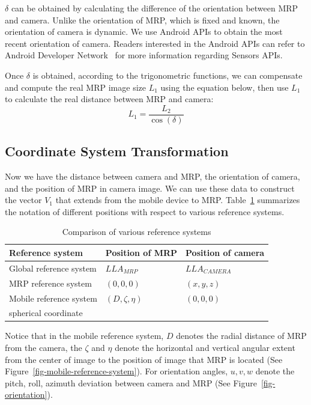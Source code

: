 $\delta$ can be obtained by calculating the difference of the orientation between MRP and camera. Unlike the orientation of MRP, which is fixed and known, the orientation of camera is dynamic. We use Android APIs to obtain the most recent orientation of camera. Readers interested in the Android APIs can refer to Android Developer Network~\cite{android-sensors-apis} for more information regarding Sensors APIs.

Once $\delta$ is obtained, according to the trigonometric functions, we can compensate and compute the real MRP image size \emph{$L_1$} using the equation below, then use \emph{$L_1$} to calculate the real distance between MRP and camera:
\[L_1 = \frac{{L_2}}{{\cos (\delta )}}\]

\subsection{Coordinate System Transformation}
Now we have the distance between camera and MRP, the orientation of camera, and the position of MRP in camera image. We can use these data to construct the vector \emph{$V_1$} that extends from the mobile device to MRP. Table~\ref{tb-comare-reference-system} summarizes the notation of different positions with respect to various reference systems.
\begin{table}
\begin{center}
    \begin{tabular}{ | l | l | l | }
    \hline
    Reference system & Position of MRP & Position of camera\\ \hline\hline
    Global reference system & $LLA_{MRP}$ & $LLA_{CAMERA}$\\ \hline
    MRP reference system & $(0,0,0)$ & $(x,y,z)$\\ \hline
    Mobile reference system & $(D,\zeta,\eta)$ & $(0,0,0)$\\
    spherical coordinate~\cite{wiki-spherical-coordinate-system} & & \\ \hline
    \end{tabular}
\end{center}
\caption{Comparison of various reference systems}\label{tb-comare-reference-system}
\end{table}


Notice that in the mobile reference system, $D$ denotes the radial distance of MRP from the camera, the $\zeta$ and $\eta$ denote the horizontal and vertical angular extent from the center of image to the position of image that MRP is located (See Figure~\ref{fig-mobile-reference-system}). For orientation angles, $u,v,w$ denote the pitch, roll, azimuth deviation between camera and MRP (See Figure~\ref{fig-orientation}).


